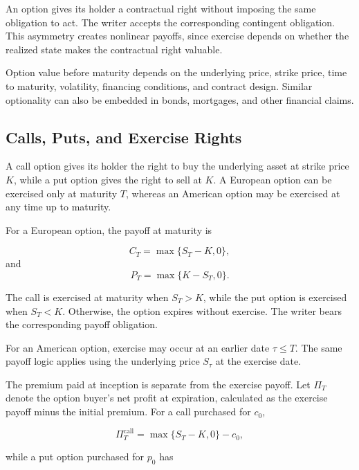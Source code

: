 An option gives its holder a contractual right without imposing the same obligation to act. The writer accepts the corresponding contingent obligation. This asymmetry creates nonlinear payoffs, since exercise depends on whether the realized state makes the contractual right valuable.

Option value before maturity depends on the underlying price, strike price, time to maturity, volatility, financing conditions, and contract design. Similar optionality can also be embedded in bonds, mortgages, and other financial claims.

\subsection{Calls, Puts, and Exercise Rights}

A call option gives its holder the right to buy the underlying asset at strike price \(K\), while a put option gives the right to sell at \(K\). A European option can be exercised only at maturity \(T\), whereas an American option may be exercised at any time up to maturity.

For a European option, the payoff at maturity is

\begin{equation}
C_T=\max\{S_T-K,0\},
\label{eq:ch18-call-payoff}
\end{equation}
and
\begin{equation}
P_T=\max\{K-S_T,0\}.
\label{eq:ch18-put-payoff}
\end{equation}

The call is exercised at maturity when \(S_T>K\), while the put option is exercised when \(S_T<K\). Otherwise, the option expires without exercise. The writer bears the corresponding payoff obligation.

For an American option, exercise may occur at an earlier date \(\tau \le T\). The same payoff logic applies using the underlying price \(S_\tau\) at the exercise date.

The premium paid at inception is separate from the
exercise payoff. Let $\Pi_T$ denote the option buyer's
net profit at expiration, calculated as the exercise
payoff minus the initial premium. For a call purchased
for $c_0$,

\begin{equation}
\Pi_T^{\mathrm{call}}
=
\max\{S_T-K,0\}-c_0,
\label{eq:ch18-call-profit}
\end{equation}

while a put option purchased for \(p_0\) has

